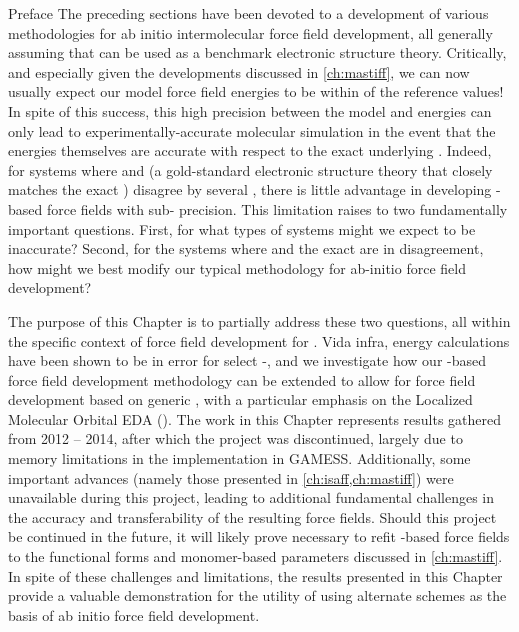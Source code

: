 \begin{section}{Preface}
The preceding sections have been devoted to a development of various methodologies for ab initio intermolecular force
field development, all generally assuming that \sapt can be used as a benchmark electronic structure
theory. Critically, and especially given the developments discussed in
\cref{ch:mastiff},
we can now usually expect our model force field energies to be within
 of the \sapt reference values! In spite of this
success, this high precision between the model
and \sapt energies can only lead to experimentally-accurate molecular
simulation in the event that the \sapt energies themselves are
accurate with respect to the exact underlying \pes. 
Indeed, for systems where \sapt
and \ccsdt (a gold-standard electronic structure theory that closely matches
the exact \pes) disagree by several
\kjmol{}, there is little advantage in developing
\sapt-based force fields with sub-\kjmol{} precision. This limitation raises to two
fundamentally important questions. 
First, for what types of systems might we expect \sapt to be inaccurate? Second,
for the systems where \sapt and the exact \pes are in disagreement, how
might we best modify our typical methodology for ab-initio force field development?

The purpose of this Chapter is to partially address these two questions, all
within the specific context of force field development for \cus \mofs.
Vida infra, \sapt energy calculations have been shown to be in error for select \cus-\mofs,
and we investigate how our \sapt-based force field development methodology
can be extended to allow for force field development based on
generic \edas,
\cite{Pastorczak2017,Horn2016b,Su2014,Su2009,Fedorov2006,CruzHernandez2006,Jeziorski1994}
with a particular emphasis on the Localized Molecular Orbital EDA (\lmoeda).
\cite{Su2009,Chen2010}
The work in this Chapter represents results gathered from 2012 -- 2014, after
which the project was discontinued,  largely due to memory limitations in the
\lmoeda implementation in GAMESS. 
Additionally, some
important advances (namely those presented in \cref{ch:isaff,ch:mastiff}) were
unavailable during this project, leading to additional fundamental challenges
in the accuracy and transferability of the resulting force fields.
Should this project be continued in the
future, it will likely prove necessary to refit \eda-based force
fields to the functional forms and monomer-based parameters
discussed in \cref{ch:mastiff}.
In spite of these challenges and limitations, the results presented in this
Chapter provide a valuable
demonstration for the utility of using alternate \eda schemes as the basis
of ab initio force field development.


\end{section}

